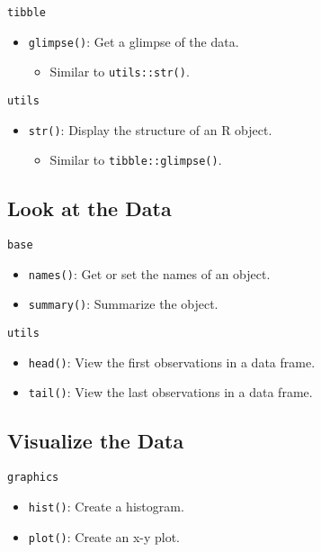 \documentclass[]{book}
\providecommand{\tightlist}{%
  \setlength{\itemsep}{0pt}\setlength{\parskip}{0pt}}
\theoremstyle{definition}
\theoremstyle{definition}
\theoremstyle{definition}
\theoremstyle{remark}
\begin{document}
\texttt{tibble}

\begin{itemize}
\tightlist
\item
  \texttt{glimpse()}: Get a glimpse of the data.

  \begin{itemize}
  \tightlist
  \item
    Similar to \texttt{utils::str()}.
  \end{itemize}
\end{itemize}

\texttt{utils}

\begin{itemize}
\tightlist
\item
  \texttt{str()}: Display the structure of an R object.

  \begin{itemize}
  \tightlist
  \item
    Similar to \texttt{tibble::glimpse()}.
  \end{itemize}
\end{itemize}

\subsection{Look at the Data}\label{look-at-the-data}

\texttt{base}

\begin{itemize}
\tightlist
\item
  \texttt{names()}: Get or set the names of an object.
\item
  \texttt{summary()}: Summarize the object.
\end{itemize}

\texttt{utils}

\begin{itemize}
\tightlist
\item
  \texttt{head()}: View the first observations in a data frame.
\item
  \texttt{tail()}: View the last observations in a data frame.
\end{itemize}

\subsection{Visualize the Data}\label{visualize-the-data}

\texttt{graphics}

\begin{itemize}
\tightlist
\item
  \texttt{hist()}: Create a histogram.
\item
  \texttt{plot()}: Create an x-y plot.
\end{itemize}
\end{document}

